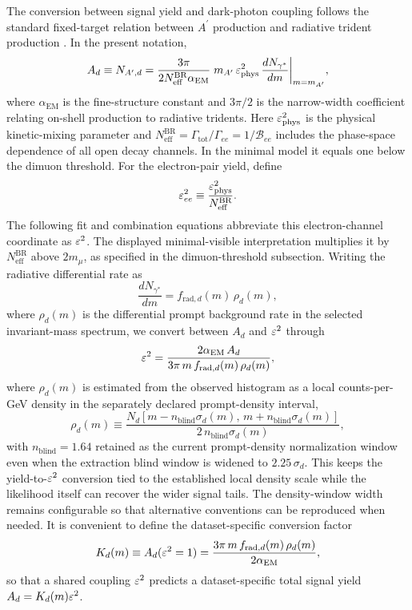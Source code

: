 The conversion between signal yield and dark-photon coupling follows the standard
fixed-target relation between $A^\prime$ production and radiative trident production
\cite{EssigEtAl2011,HPS2015DarkPhoton,HPS2016PromptLong}. In the present notation,
\begin{equation}
A_d\equiv N_{A^\prime,d}
= \frac{3\pi}{2N_{\mathrm{eff}}^{\mathrm{BR}}\alpha_{\mathrm{EM}}}
\; m_{A^\prime}\,\varepsilon_{\rm phys}^2\,
\frac{dN_{\gamma^\ast}}{dm}\bigg|_{m=m_{A^\prime}},
\end{equation}
where $\alpha_{\mathrm{EM}}$ is the fine-structure constant and $3\pi/2$ is the
narrow-width coefficient relating on-shell production to radiative tridents.
Here $\varepsilon_{\rm phys}^2$ is the physical kinetic-mixing parameter and
$N_{\mathrm{eff}}^{\mathrm{BR}}=\Gamma_{\mathrm{tot}}/\Gamma_{ee}
=1/\mathcal B_{ee}$ includes the phase-space dependence of all open decay
channels. In the minimal model it equals one below the dimuon threshold.
For the electron-pair yield, define
\begin{equation}
 \varepsilon_{ee}^2\equiv\frac{\varepsilon_{\rm phys}^2}{N_{\mathrm{eff}}^{\mathrm{BR}}}.
\end{equation}
The following fit and combination equations abbreviate this electron-channel
coordinate as $\varepsilon^2$. The displayed minimal-visible interpretation multiplies
it by $N_{\mathrm{eff}}^{\mathrm{BR}}$ above $2m_\mu$, as specified in the
dimuon-threshold subsection. Writing the
radiative differential rate as
\begin{equation}
\frac{dN_{\gamma^\ast}}{dm}
= f_{\mathrm{rad},d}(m)\,\rho_d(m),
\end{equation}
where $\rho_d(m)$ is the differential prompt background rate in the selected
invariant-mass spectrum, we convert between $A_d$ and $\varepsilon^2$ through
\begin{equation}
\varepsilon^2 =
\frac{2\alpha_{\mathrm{EM}}\,A_d}
{3\pi\,m\,f_{\mathrm{rad},d}(m)\,\rho_d(m)},
\label{eq:eps2-conversion}
\end{equation}
where $\rho_d(m)$ is estimated from the observed histogram as a local counts-per-GeV
density in the separately declared prompt-density interval,
\begin{equation}
\rho_d(m)\equiv
\frac{N_d\!\left[m-n_{\mathrm{blind}}\sigma_d(m),\,m+n_{\mathrm{blind}}\sigma_d(m)\right]}
{2\,n_{\mathrm{blind}}\sigma_d(m)},
\end{equation}
with $n_{\mathrm{blind}}=1.64$ retained as the current prompt-density normalization
window even when the extraction blind window is widened to $2.25\,\sigma_d$. This keeps
the yield-to-$\varepsilon^2$ conversion tied to the established local density scale while
the likelihood itself can recover the wider signal tails. The density-window width
remains configurable so that alternative conventions can be reproduced when needed.
It is convenient to define the
dataset-specific conversion factor
\begin{equation}
K_d(m) \equiv A_d(\varepsilon^2 = 1)
= \frac{3\pi\,m\,f_{\mathrm{rad},d}(m)\,\rho_d(m)}{2\alpha_{\mathrm{EM}}},
\label{eq:Kd-conversion}
\end{equation}
so that a shared coupling $\varepsilon^2$ predicts a dataset-specific total signal yield
$A_d = K_d(m)\varepsilon^2$.

